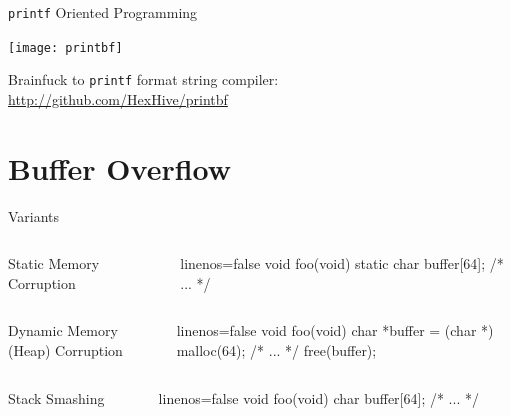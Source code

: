 \documentclass[beamer]{uibk}
\begin{document}
\begin{frame}{\texttt{printf} Oriented Programming}
    \begin{center}
        \texttt{[image: printbf]}
    \end{center}

    Brainfuck to \texttt{printf} format string compiler:\\
    \url{http://github.com/HexHive/printbf}
\end{frame}

\section{Buffer Overflow}

\begin{frame}[fragile]{Variants}
    \begin{columns}
        \begin{column}{0.5\textwidth}
            Static Memory Corruption
        \end{column}
        \begin{column}{0.5\textwidth}
            \begin{ccode*}{linenos=false}
                void foo(void) {
                    static char buffer[64];
                    /* ... */
                }
            \end{ccode*}
        \end{column}
    \end{columns}
    \medskip
    \pause
    \begin{columns}
        \begin{column}{0.5\textwidth}
            Dynamic Memory (Heap) Corruption
        \end{column}
        \begin{column}{0.5\textwidth}
            \begin{ccode*}{linenos=false}
                void foo(void) {
                    char *buffer = (char *) malloc(64);
                    /* ... */
                    free(buffer);
                }
            \end{ccode*}
        \end{column}
    \end{columns}
    \medskip
    \pause
    \begin{columns}
        \begin{column}{0.5\textwidth}
            Stack Smashing
        \end{column}
        \begin{column}{0.5\textwidth}
            \begin{ccode*}{linenos=false}
                void foo(void) {
                    char buffer[64];
                    /* ... */
                }
            \end{ccode*}
        \end{column}
    \end{columns}
\end{frame}
\end{document}
